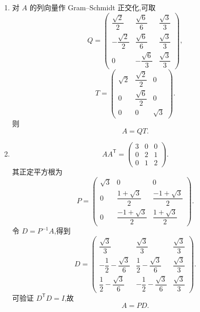 \begin{solution}
\leavevmode
\begin{enumerate}
    \item 对 $A$ 的列向量作 Gram--Schmidt 正交化,可取
    \[
    Q=
    \begin{pmatrix}
    \dfrac{\sqrt2}{2}&\dfrac{\sqrt6}{6}&\dfrac{\sqrt3}{3}\\[4pt]
    -\dfrac{\sqrt2}{2}&\dfrac{\sqrt6}{6}&\dfrac{\sqrt3}{3}\\[4pt]
    0&-\dfrac{\sqrt6}{3}&\dfrac{\sqrt3}{3}
    \end{pmatrix},
    \]
    \[
    T=
    \begin{pmatrix}
    \sqrt2&\dfrac{\sqrt2}{2}&0\\[4pt]
    0&\dfrac{\sqrt6}{2}&0\\[4pt]
    0&0&\sqrt3
    \end{pmatrix}.
    \]
    则
    \[
    \boxed{A=QT}.
    \]

    \item
    \[
    AA^{\mathsf T}
    =
    \begin{pmatrix}
    3&0&0\\
    0&2&1\\
    0&1&2
    \end{pmatrix}.
    \]
    其正定平方根为
    \[
    P=
    \begin{pmatrix}
    \sqrt3&0&0\\[2pt]
    0&\dfrac{1+\sqrt3}{2}&\dfrac{-1+\sqrt3}{2}\\[5pt]
    0&\dfrac{-1+\sqrt3}{2}&\dfrac{1+\sqrt3}{2}
    \end{pmatrix}.
    \]
    令 $D=P^{-1}A$,得到
    \[
    D=
    \begin{pmatrix}
    \dfrac{\sqrt3}{3}&\dfrac{\sqrt3}{3}&\dfrac{\sqrt3}{3}\\[4pt]
    -\dfrac12-\dfrac{\sqrt3}{6}&\dfrac12-\dfrac{\sqrt3}{6}&\dfrac{\sqrt3}{3}\\[4pt]
    \dfrac12-\dfrac{\sqrt3}{6}&-\dfrac12-\dfrac{\sqrt3}{6}&\dfrac{\sqrt3}{3}
    \end{pmatrix}.
    \]
    可验证 $D^{\mathsf T}D=I$,故
    \[
    \boxed{A=PD}.
    \]


\end{enumerate}
\end{solution}
